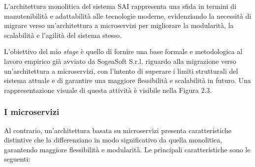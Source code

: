             \vspace{0.2 em}
            \noindent L’architettura monolitica del sistema SAI rappresenta una sfida in termini di manutenibilità e adattabilità alle tecnologie moderne, evidenziando la necessità di migrare verso un’architettura a microservizi per migliorare la modularità, la scalabilità e l’agilità del sistema stesso.

            \vspace{0.2 em}
            \noindent L'obiettivo del mio \textit{stage} è quello di fornire una base formale e metodologica al lavoro empirico già avviato da SogeaSoft S.r.l. riguardo alla migrazione verso un'architettura a microservizi, con l’intento di superare i limiti strutturali del sistema attuale e di garantire una maggiore flessibilità e scalabilità in futuro. Una rappresentazione visuale di questa attività è visibile nella Figura 2.3.

            \subsubsection{I microservizi}
            Al contrario, un’architettura basata su microservizi presenta caratteristiche distintive che la differenziano in modo significativo da quella monolitica, garantendo maggiore flessibilità e modularità. Le principali caratteristiche sono le seguenti:  

